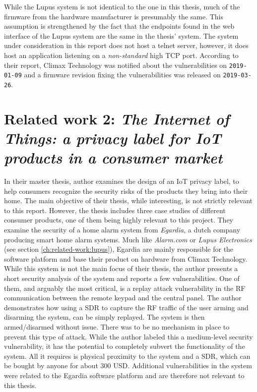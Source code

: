 While the Lupus system is not identical to the one in this thesis, much of the firmware from the hardware manufacturer is presumably the same. This assumption is strengthened by the fact that the endpoints found in the web interface of the Lupus system are the same in the thesis' system. The system under consideration in this report does not host a telnet server, however, it does host an application listening on a \textit{non-standard} high TCP port. According to their report, Climax Technology was notified about the vulnerabilities on \texttt{2019-01-09} and a firmware revision fixing the vulnerabilities was released on \texttt{2019-03-26}.

\section{Related work 2: \textit{The Internet of Things: a privacy label for IoT products in a consumer market}}
In their master thesis, author \citeauthor{iotprivacylabel} examines the design of an IoT privacy label, to help consumers recognize the security risks of the products they bring into their home. The main objective of their thesis, while interesting, is not strictly relevant to this report. However, the thesis includes three case studies of different consumer products, one of them being highly relevant to this project. They examine the security of a home alarm system from \textit{Egardia}, a dutch company producing smart home alarm systems. Much like \textit{Alarm.com} or \textit{Lupus Electronics} (see section \ref{ch:related-work:lupus}), Egardia are mainly responsible for the software platform and base their product on hardware from Climax Technology. While this system is not the main focus of their thesis, the author presents a short security analysis of the system and reports a few vulnerabilities. One of them, and arguably the most critical, is a replay attack vulnerability in the \gls{RF} communication between the remote keypad and the central panel. The author demonstrates how using a \gls{SDR} to capture the \gls{RF} traffic of the user arming and disarming the system, can be simply replayed. The system is then armed/disarmed without issue. There was to be no mechanism in place to prevent this type of attack. While the author labeled this a medium-level security vulnerability, it has the potential to completely subvert the functionality of the system. All it requires is physical proximity to the system and a \gls{SDR}, which can be bought by anyone for about 300 USD. Additional vulnerabilities in the system were related to the Egardia software platform and are therefore not relevant to this thesis.

